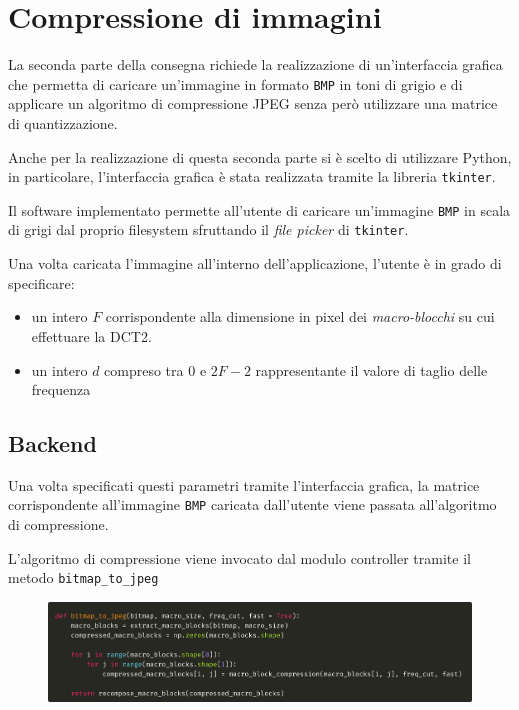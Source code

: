 \documentclass[a4paper, 12pt]{article}
\begin{document}
\section{Compressione di immagini}
La seconda parte della consegna richiede la realizzazione di un'interfaccia
grafica che permetta di caricare un'immagine in formato \texttt{BMP} in toni di
grigio e di applicare un algoritmo di compressione JPEG senza però utilizzare una
matrice di quantizzazione.



Anche per la realizzazione di questa seconda parte si è scelto di utilizzare
Python, in particolare, l'interfaccia grafica è stata realizzata tramite la
libreria \texttt{tkinter}.

Il software implementato permette all'utente di caricare un'immagine
\texttt{BMP} in scala di grigi dal proprio filesystem sfruttando il \textit{file
picker} di \texttt{tkinter}.

Una volta caricata l'immagine all'interno dell'applicazione, l'utente è in grado
di specificare:

\begin{itemize}
  \item un intero $F$ corrispondente alla dimensione in pixel dei
        \textit{macro-blocchi} su cui effettuare la DCT2.
  \item un intero $d$ compreso tra $0$ e $2F - 2$ rappresentante il valore di
        taglio delle frequenza
\end{itemize}


\subsection{Backend}

Una volta specificati questi parametri tramite l'interfaccia grafica, la matrice
corrispondente all'immagine \texttt{BMP} caricata dall'utente viene passata
all'algoritmo di compressione.

L'algoritmo di compressione viene invocato dal modulo controller tramite il metodo
\texttt{bitmap\_to\_jpeg} 
\begin{figure}[h]
  \centering
  \includegraphics[width=1\textwidth]{./imgs/bitmap-to-jpeg.png}
  \label{fig:bitmap-to-jpeg}
\end{figure}
\end{document}

